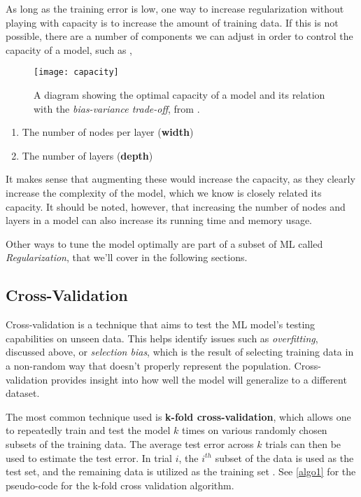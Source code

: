 \documentclass{article}
\begin{document}
  As long as the training error is low, one way to increase regularization without playing with capacity is to increase the amount of training data. If this is not possible, there are a number of components we can adjust in order to control the capacity of a model, such as \citep{capacity-Brownlee}, 
\begin{wrapfigure}{R}{0.4\textwidth} %
    \centering
    \texttt{[image: capacity]}
    \caption{A diagram showing the optimal capacity of a model and its relation with the \textit{bias-variance trade-off}, from \citep{capacity-Kowalik}.}
    \label{fig:capacity}
\end{wrapfigure}
  \begin{enumerate}
    \item The number of nodes per layer (\textbf{width}) 
    \item The number of layers (\textbf{depth})
  \end{enumerate}
  It makes sense that augmenting these would increase the capacity, as they clearly increase the complexity of the model, which we know is closely related its capacity. It should be noted, however, that increasing the number of nodes and layers in a model can also increase its running time and memory usage. 

  Other ways to tune the model optimally are part of a subset of ML called \textit{Regularization}, that we'll cover in the following sections. 

  \subsection{Cross-Validation}%
  \label{sub:Cross-Validation}
Cross-validation is a technique that aims to test the ML model's testing capabilities on unseen data. This helps identify issues such as \textit{overfitting}, discussed above, or \textit{selection bias}, which is the result of selecting training data in a non-random way that doesn't properly represent the population. Cross-validation provides insight into how well the model will generalize to a different dataset.

The most common technique used is \textbf{k-fold cross-validation}, which allows one to repeatedly train and test the model $k$ times on various randomly chosen subsets of the training data. The average test error across $k$ trials can then be used to estimate the test error. In trial $i$, the $i^{th}$ subset of the data is used as the test set, and the remaining data is utilized as the training set \citep{Goodfellow-et-al-2016}. See \autoref{algo1} for the pseudo-code for the k-fold cross validation algorithm.
\end{document}
